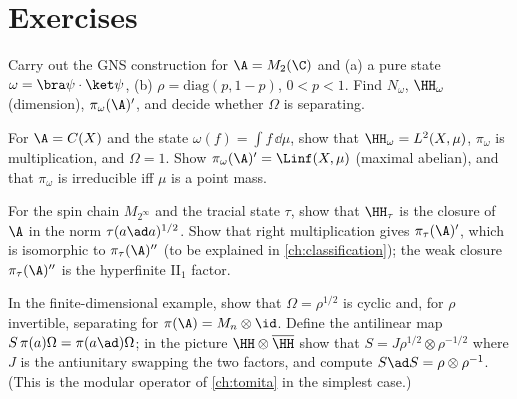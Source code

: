 \section*{Exercises}
\begin{exercise}
Carry out the GNS construction for $\A=M_2(\C)$ and (a) a pure state $\omega=\bra\psi\cdot\ket\psi$, (b) $\rho=\mathrm{diag}(p,1-p)$, $0<p<1$. Find $N_\omega$, $\HH_\omega$ (dimension), $\pi_\omega(\A)'$, and decide whether $\Omega$ is separating.
\end{exercise}
\begin{exercise}
For $\A=C(X)$ and the state $\omega(f)=\int f\,\dd\mu$, show that $\HH_\omega=L^2(X,\mu)$, $\pi_\omega$ is multiplication, and $\Omega=1$. Show $\pi_\omega(\A)'=\Linf(X,\mu)$ (maximal abelian), and that $\pi_\omega$ is irreducible iff $\mu$ is a point mass.
\end{exercise}
\begin{exercise}
For the spin chain $M_{2^\infty}$ and the tracial state $\tau$, show that $\HH_\tau$ is the closure of $\A$ in the norm $\tau(a\ad a)^{1/2}$. Show that right multiplication gives $\pi_\tau(\A)'$, which is isomorphic to $\pi_\tau(\A)''$ (to be explained in \cref{ch:classification}); the weak closure $\pi_\tau(\A)''$ is the hyperfinite II$_1$ factor.
\end{exercise}
\begin{exercise}
In the finite-dimensional example, show that $\Omega=\rho^{1/2}$ is cyclic and, for $\rho$ invertible, separating for $\pi(\A)=M_n\otimes\id$. Define the antilinear map $S\,\pi(a)\Omega=\pi(a\ad)\Omega$; in the picture $\HH\otimes\overline\HH$ show that $S=J\rho^{1/2}\otimes\rho^{-1/2}$ where $J$ is the antiunitary swapping the two factors, and compute $S\ad S=\rho\otimes\rho^{-1}$. (This is the modular operator of \cref{ch:tomita} in the simplest case.)
\end{exercise}
